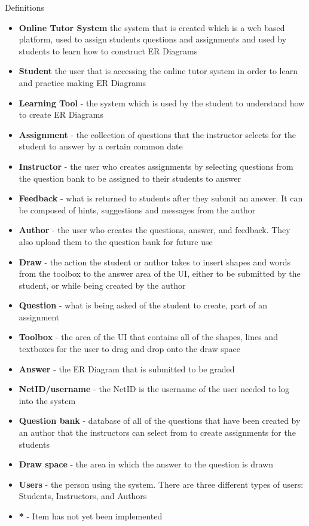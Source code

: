 	\begin{chapter}{Definitions}
 		\begin{itemize}
 			\item{\textbf{Online Tutor System}  the system that is created which is a web based platform, 
 			used to assign students questions and assignments and used by students to learn how to 
 			construct ER Diagrams}
			\item{\textbf{Student}  the user that is accessing the online tutor system in order to learn 
			and practice making ER Diagrams}
			\item{\textbf{Learning Tool} - the system which is used by the student to understand how to 
			create ER Diagrams}
			\item{\textbf{Assignment} - the collection of questions that the instructor selects for the 
			student to answer by a certain common date}
			\item{\textbf{Instructor} - the user who creates assignments by selecting questions from the 
			question bank to be assigned to their students to answer}
			\item{\textbf{Feedback} - what is returned to students after they submit an answer.  It can be 
			composed of hints, suggestions and messages from the author}
			\item{\textbf{Author} - the user who creates the questions, answer, and feedback.  They also 
			upload them to the question bank for future use}
			\item{\textbf{Draw} - the action the student or author takes to insert shapes and words from 
			the toolbox to the answer area of the UI, either to be submitted by the student, or while 
			being created by the author}
			\item{\textbf{Question} - what is being asked of the student to create, part of an assignment}
			\item{\textbf{Toolbox} - the area of the UI that contains all of the shapes, lines and textboxes 
			for the user to drag and drop onto the draw space}
			\item{\textbf{Answer} - the ER Diagram that is submitted to be graded}
			\item{\textbf{NetID/username} - the NetID is the username of the user needed to log into the 
			system}
			\item{\textbf{Question bank} - database of all of the questions that have been created by an 
			author that the instructors can select from to create assignments for the students}
			\item{\textbf{Draw space} - the area in which the answer to the question is drawn}
			\item{\textbf{Users} - the person using the system. There are three different types of users: 
			Students, Instructors, and Authors}
			\item{\textbf{*} - Item has not yet been implemented}
		\end{itemize}
	\end{chapter}
